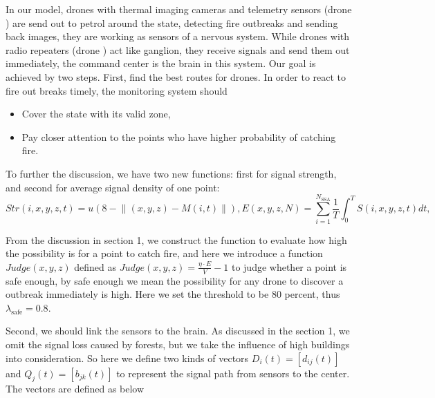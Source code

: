 \documentclass[13pt]{ctexart} %
\begin{document}
In our model, drones with thermal imaging cameras and telemetry sensors (drone \uppercase\expandafter{}) are send out to petrol around the state, detecting fire outbreaks and sending back images, they are working as sensors of a nervous system. While drones with radio repeaters (drone \uppercase\expandafter{}) act like ganglion, they receive signals and send them out immediately, the command center is the brain in this system. Our goal is achieved by two steps. First, find the best routes for drones\uppercase\expandafter{}. In order to react to fire out breaks timely, the monitoring system should

\begin{itemize}
    \item Cover the state with its valid zone,
    \item Pay closer attention to the points who have higher probability of catching fire.
\end{itemize}

To further the discussion, we have two new functions: first for signal strength, and second for average signal density of one point:
\begin{subequations}
    \begin{equation}
        Str(i,x,y,z,t)=u\left(8-\lVert (x,y,z)-M(i,t)\rVert\right),
    \end{equation}
    \begin{equation}
        E(x,y,z,N)=\sum_{i=1}^{N_{\text{SSA}}}\frac{1}{T}\int_{0}^{T}S(i,x,y,z,t)dt,
    \end{equation}
\end{subequations}

From the discussion in section 1, we construct the function \label{PossibilityFire} to evaluate how high the possibility is for a point to catch fire, and here we introduce a function $Judge(x, y,z)$ defined as $Judge(x,y,z)=\frac{\eta \cdot E}{V}-1$ to judge whether a point is safe enough, by safe enough we mean the possibility for any drone \uppercase\expandafter{} to discover a outbreak immediately is high. Here we set the threshold to be 80 percent, thus $\lambda_{\text{safe}}=0.8$.

Second, we should link the sensors to the brain. As discussed in the section 1, we omit the signal loss caused by forests, but we take the influence of high buildings into consideration. So here we define two kinds of vectors $D_i(t)=[d_{ij}(t)]$ and $Q_j(t)=[b_{jk}(t)]$  to represent the signal path from sensors to the center. The vectors are defined as below
\end{document}
